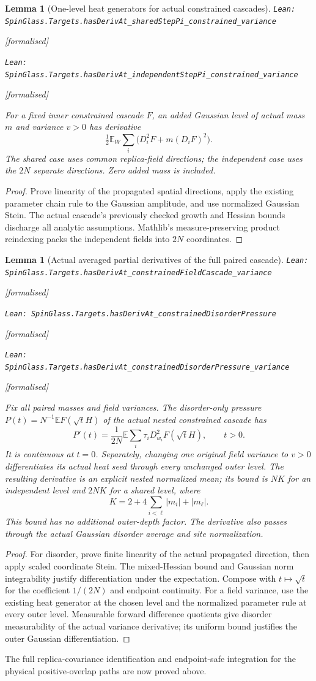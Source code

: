 \documentclass[11pt]{article}
\providecommand{\lean}[1]{\leavevmode\par\nopagebreak
  {\noindent\normalfont\footnotesize\raggedright\texttt{Lean: #1}\par}\nopagebreak}
\providecommand{\leanok}{\par\nopagebreak
  {\noindent\normalfont\footnotesize\textcolor{green!50!black}{[formalised]}\par}\nopagebreak}
\newtheorem{lemma}[theorem]{Lemma}
\begin{document}
\begin{lemma}[One-level heat generators for actual constrained cascades]
\lean{SpinGlass.Targets.hasDerivAt\_sharedStepPi\_constrained\_variance}\leanok
\lean{SpinGlass.Targets.hasDerivAt\_independentStepPi\_constrained\_variance}\leanok
For a fixed inner constrained cascade $F$, an added Gaussian level of actual
mass $m$ and variance $v>0$ has derivative
\[
 \tfrac12\mathbb E_W\sum_i\bigl(D_i^2F+m(D_iF)^2\bigr).
\]
The shared case uses common replica-field directions; the independent case
uses the $2N$ separate directions. Zero added mass is included.
\end{lemma}
\begin{proof}
Prove linearity of the propagated spatial directions, apply the existing
parameter chain rule to the Gaussian amplitude, and use normalized Gaussian
Stein. The actual cascade's previously checked growth and Hessian bounds
discharge all analytic assumptions. Mathlib's measure-preserving product
reindexing packs the independent fields into $2N$ coordinates.
\end{proof}
\begin{lemma}[Actual averaged partial derivatives of the full paired cascade]
\lean{SpinGlass.Targets.hasDerivAt\_constrainedFieldCascade\_variance}\leanok
\lean{SpinGlass.Targets.hasDerivAt\_constrainedDisorderPressure}\leanok
\lean{SpinGlass.Targets.hasDerivAt\_constrainedDisorderPressure\_variance}\leanok
Fix all paired masses and field variances. The disorder-only pressure
$P(t)=N^{-1}\mathbb E F(\sqrt t H)$ of the actual nested constrained cascade has
\[
 P'(t)=\frac1{2N}\mathbb E\sum_i\tau_i D_{w_i}^2F(\sqrt t H),\qquad t>0.
\]
It is continuous at $t=0$. Separately, changing one original field variance
to $v>0$ differentiates its actual heat seed through every unchanged outer
level. The resulting derivative is an explicit nested normalized mean; its
bound is $NK$ for an independent level and $2NK$ for a shared level, where
\[
 K=2+4\sum_{i<\ell}|m_i|+|m_\ell|.
\]
This bound has no additional outer-depth factor. The derivative also passes
through the actual Gaussian disorder average and site normalization.
\end{lemma}
\begin{proof}
For disorder, prove finite linearity of the actual propagated direction, then
apply scaled coordinate Stein. The mixed-Hessian bound and Gaussian norm
integrability justify differentiation under the expectation. Compose with
$t\mapsto\sqrt t$ for the coefficient $1/(2N)$ and endpoint continuity.
For a field variance, use the existing heat generator at the chosen level and
the normalized parameter rule at every outer level. Measurable forward
difference quotients give disorder measurability of the actual variance
derivative; its uniform bound justifies the outer Gaussian differentiation.
\end{proof}
The full replica-covariance identification and endpoint-safe integration for
the physical positive-overlap paths are now proved above.
\end{document}
